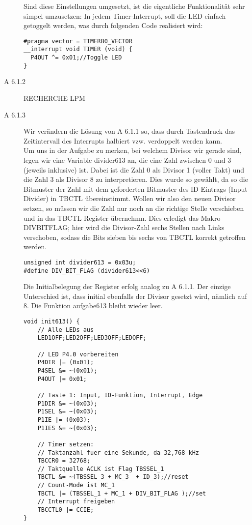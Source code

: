 \documentclass[11pt,a4paper,ngerman]{article}
\begin{document}
\begin{description}
Sind diese Einstellungen umgesetzt, ist die eigentliche Funktionalität sehr simpel umzusetzen: In jedem Timer-Interrupt, soll die LED einfach getoggelt werden, was durch folgenden Code realisiert wird: 
\begin{lstlisting}
#pragma vector = TIMERB0_VECTOR
__interrupt void TIMER (void) {
  P4OUT ^= 0x01;//Toggle LED
}
\end{lstlisting}

\item[A 6.1.2] RECHERCHE LPM

\item[A 6.1.3] Wir verändern die Lösung von A 6.1.1 so, dass durch Tastendruck das Zeitintervall des Interrupts halbiert vzw. verdoppelt werden kann. \\

Um uns in der Aufgabe zu merken, bei welchem Divisor wir gerade sind, legen wir eine Variable divider613 an, die eine Zahl zwischen 0 und 3 (jeweils inklusive) ist. Dabei ist die Zahl 0 als Divisor 1 (voller Takt) und die Zahl 3 als Divisor 8 zu interpretieren. Dies wurde so gewählt, da so die Bitmuster der Zahl mit dem geforderten Bitmuster des ID-Eintrags (Input Divider) in TBCTL übereinstimmt. Wollen wir also den neuen Divisor setzen, so müssen wir die Zahl nur noch an die richtige Stelle verschieben und in das TBCTL-Register übernehmn. Dies erledigt das Makro DIV\textunderscore BIT\textunderscore FLAG; hier wird die Divisor-Zahl sechs Stellen nach Links verschoben, sodass die Bits sieben bis sechs von TBCTL korrekt getroffen werden.
\begin{lstlisting}
unsigned int divider613 = 0x03u;
#define DIV_BIT_FLAG (divider613<<6)
\end{lstlisting}

Die Initialbelegung der Register erfolg analog zu A 6.1.1. Der einzige Unterschied ist, dass initial ebenfalls der Divisor gesetzt wird, nämlich auf 8. Die Funktion aufgabe613 bleibt wieder leer.

\begin{lstlisting}
void init613() {
	// Alle LEDs aus
	LED1OFF;LED2OFF;LED3OFF;LEDOFF;
    
    // LED P4.0 vorbereiten
    P4DIR |= (0x01);
    P4SEL &= ~(0x01);
    P4OUT |= 0x01;
    
    // Taste 1: Input, IO-Funktion, Interrupt, Edge
    P1DIR &= ~(0x03);
    P1SEL &= ~(0x03);
    P1IE |= (0x03);
    P1IES &= ~(0x03);
    
    // Timer setzen:
    // Taktanzahl fuer eine Sekunde, da 32,768 kHz
    TBCCR0 = 32768; 
    // Taktquelle ACLK ist Flag TBSSEL_1
    TBCTL &= ~(TBSSEL_3 + MC_3  + ID_3);//reset 
    // Count-Mode ist MC_1
    TBCTL |= (TBSSEL_1 + MC_1 + DIV_BIT_FLAG );//set
    // Interrupt freigeben
    TBCCTL0 |= CCIE; 
}


\end{lstlisting}
\end{description}
\end{document}
